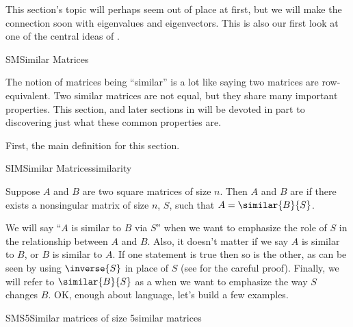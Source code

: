 %
\begin{introduction}
\begin{para}This section's topic will perhaps seem out of place at first, but we will make the connection soon with eigenvalues and eigenvectors.  This is also our first look at one of the central ideas of .\end{para}
\end{introduction}
%
\begin{subsect}{SM}{Similar Matrices}
%
\begin{para}The notion of matrices being ``similar'' is a lot like saying two matrices are row-equivalent.  Two similar matrices are not equal, but they share many important properties.  This section, and later sections in  will be devoted in part to discovering just what these common properties are.\end{para}
%
\begin{para}First, the main definition for this section.\end{para}
%
\begin{definition}{SIM}{Similar Matrices}{similarity}
\begin{para}Suppose $A$ and $B$ are two square matrices of size $n$.  Then $A$ and $B$ are  if there exists a nonsingular matrix of size $n$, $S$, such that $A=\similar{B}{S}$.\end{para}
\end{definition}
%
\begin{para}We will say ``$A$ is similar to $B$ via $S$'' when we want to emphasize the role of $S$ in the relationship between $A$ and $B$.  Also, it doesn't matter if we say $A$ is similar to $B$, or $B$ is similar to $A$.  If one statement is true then so is the other, as can be seen by using $\inverse{S}$ in place of $S$ (see  for the careful proof).    Finally, we will refer to $\similar{B}{S}$ as a  when we want to emphasize the way $S$ changes $B$.  OK, enough about language, let's build a few examples.\end{para}
%
%
\begin{example}{SMS5}{Similar matrices of size 5}{similar matrices}

\end{example}
\end{subsect}
